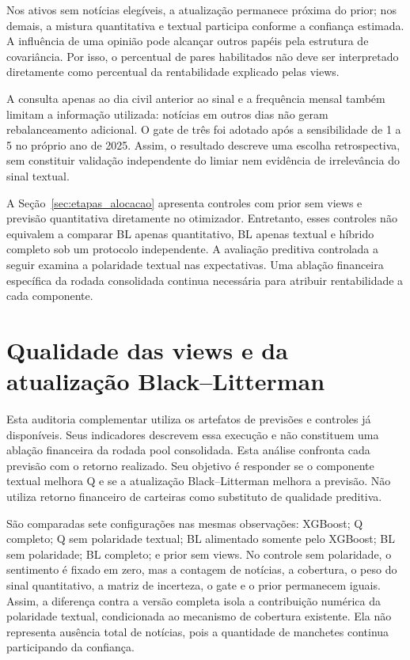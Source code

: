 Nos ativos sem notícias elegíveis, a atualização permanece próxima do prior; nos demais, a mistura quantitativa e textual participa conforme a confiança estimada. A influência de uma opinião pode alcançar outros papéis pela estrutura de covariância. Por isso, o percentual de pares habilitados não deve ser interpretado diretamente como percentual da rentabilidade explicado pelas views.

A consulta apenas ao dia civil anterior ao sinal e a frequência mensal também limitam a informação utilizada: notícias em outros dias não geram rebalanceamento adicional. O gate de três foi adotado após a sensibilidade de 1 a 5 no próprio ano de 2025. Assim, o resultado descreve uma escolha retrospectiva, sem constituir validação independente do limiar nem evidência de irrelevância do sinal textual.

A Seção~\ref{sec:etapas_alocacao} apresenta controles com prior sem views e previsão quantitativa diretamente no otimizador. Entretanto, esses controles não equivalem a comparar BL apenas quantitativo, BL apenas textual e híbrido completo sob um protocolo independente. A avaliação preditiva controlada a seguir examina a polaridade textual nas expectativas. Uma ablação financeira específica da rodada consolidada continua necessária para atribuir rentabilidade a cada componente.

\section{Qualidade das views e da atualização Black--Litterman}

Esta auditoria complementar utiliza os artefatos de previsões e controles já disponíveis. Seus indicadores descrevem essa execução e não constituem uma ablação financeira da rodada pool consolidada. Esta análise confronta cada previsão com o retorno realizado. Seu objetivo é responder se o componente textual melhora Q e se a atualização Black--Litterman melhora a previsão. Não utiliza retorno financeiro de carteiras como substituto de qualidade preditiva.

São comparadas sete configurações nas mesmas observações: XGBoost; Q completo; Q sem polaridade textual; BL alimentado somente pelo XGBoost; BL sem polaridade; BL completo; e prior sem views. No controle sem polaridade, o sentimento é fixado em zero, mas a contagem de notícias, a cobertura, o peso do sinal quantitativo, a matriz de incerteza, o gate e o prior permanecem iguais. Assim, a diferença contra a versão completa isola a contribuição numérica da polaridade textual, condicionada ao mecanismo de cobertura existente. Ela não representa ausência total de notícias, pois a quantidade de manchetes continua participando da confiança.

